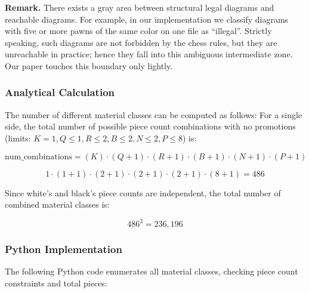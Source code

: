 \documentclass[12pt]{article}
\begin{document}
\noindent
\textbf{Remark.}  
There exists a gray area between structural legal diagrams and reachable diagrams.  
For example, in our implementation we classify diagrams with five or more pawns of the same color on one file as ``illegal''. Strictly speaking, such diagrams are not forbidden by the chess rules, but they are unreachable in practice; hence they fall into this ambiguous intermediate zone. Our paper touches this boundary only lightly.


\subsubsection{Analytical Calculation}

The number of different material classes can be computed as follows: 
For a single side, the total number of possible piece count combinations with no promotions 
(limits: $K = 1, Q \le 1, R \le 2, B \le 2, N \le 2, P \le 8$) is:

\[
\text{num\_combinations} = (K) \cdot (Q + 1) \cdot (R + 1) \cdot (B + 1) \cdot (N + 1) \cdot (P + 1)
\]

\[
1 \cdot (1 + 1) \cdot (2 + 1) \cdot (2 + 1) \cdot (2 + 1) \cdot (8 + 1) = 486
\]

Since white's and black's piece counts are independent, the total number of
combined material classes is:

\[
486^2 = 236{,}196
\]

\subsubsection{Python Implementation}

The following Python code enumerates all material classes, checking piece
count constraints and total pieces:
\end{document}
